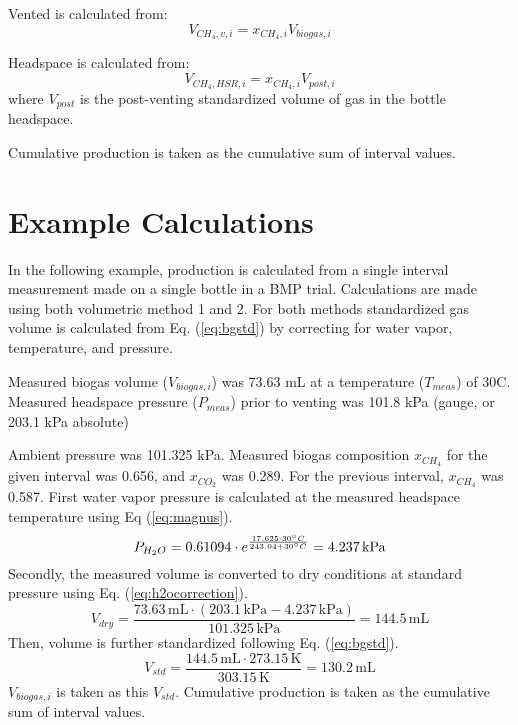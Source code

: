 \documentclass[]{article}
\newcommand{\unit}[1]{\ensuremath{\, \mathrm{#1}}}
\begin{document}
Vented  is calculated from:
\begin{equation}
  V_{CH_4, v, i} = x_{CH_4, i} V_{biogas, i}
\end{equation}

Headspace  is calculated from:
\begin{equation}
  V_{CH_4, HSR, i} = x_{CH_4, i} V_{post, i}
\end{equation}
where $V_{post}$ is the post-venting standardized volume of gas in the bottle headspace.

Cumulative production is taken as the cumulative sum of interval values. 

\section{Example Calculations}
In the following example,  production is calculated from a single interval measurement made on a single bottle in a BMP trial. Calculations are made using both volumetric method 1 and 2. 
For both methods standardized gas volume is calculated from Eq. (\ref{eq:bgstd}) by correcting for water vapor, temperature, and pressure.

Measured biogas volume ($V_{biogas,i}$) was 73.63 mL at a temperature ($T_{meas}$) of 30\degree C. Measured headspace pressure ($P_{meas}$) prior to venting was 101.8 kPa (gauge, or 203.1 kPa absolute)

Ambient pressure was 101.325 kPa. Measured biogas composition $x_{CH_4}$ for the given interval was 0.656, and $x_{CO_2}$ was 0.289. For the previous interval, $x_{CH_4}$ was 0.587.
First water vapor pressure is calculated at the measured headspace temperature using Eq (\ref{eq:magnus}).
\begin{equation*}
   P_{H_2O} = 0.61094 \cdot e^{\frac{17.625 \cdot 30\degree C}{243.04 + 30\degree C}} = 4.237\unit{kPa}
\end{equation*}
Secondly, the measured volume is converted to dry conditions at standard pressure using Eq. (\ref{eq:h2ocorrection}).
\begin{equation*}
   V_{dry} = \frac{73.63\unit{mL} \cdot (203.1\unit{kPa} - 4.237\unit{kPa})}{101.325\unit{kPa}} = 144.5\unit{mL}  
\end{equation*}
Then, volume is further standardized following Eq. (\ref{eq:bgstd}).
\begin{equation*}
    V_{std} = \frac{144.5\unit{mL} \cdot 273.15\unit{K}}{303.15\unit{K}} = 130.2\unit{mL}  
\end{equation*}
$V_{biogas,i}$ is taken as this $V_{std}$. Cumulative production is taken as the cumulative sum of interval values.
\end{document}
